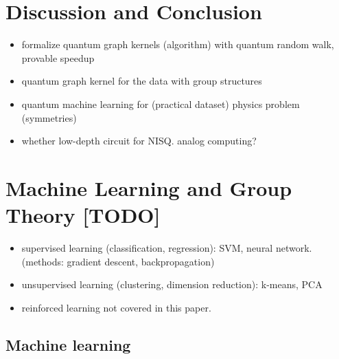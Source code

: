 \section{Discussion and Conclusion}\label{sec:discussion}
\begin{itemize}
	\item formalize quantum graph kernels (algorithm) with quantum random walk, provable speedup
	\item quantum graph kernel for the data with group structures
	\item quantum machine learning for (practical dataset) physics problem (symmetries)
	\item whether low-depth circuit for NISQ. analog computing?
\end{itemize}
\cite{ben-davidSymmetriesGraphProperties2020}


\printbibliography
\appendix

\section{Machine Learning and Group Theory [TODO]}
\begin{itemize}
	\item supervised learning (classification, regression):
	SVM, neural network. (methods: gradient descent, backpropagation)

	\item unsupervised learning (clustering, dimension reduction): k-means, PCA

	\item reinforced learning not covered in this paper.
\end{itemize}

\subsection{Machine learning}

